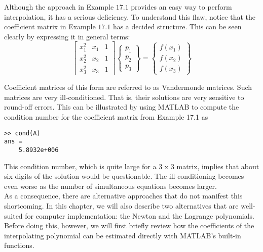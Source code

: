 \documentclass[../main.tex]{subfiles}
\begin{document}
        Although the approach in Example $17.1$ provides an easy way to perform interpolation, it has a serious deficiency. To understand this flaw, notice that the coefficient matrix in Example $17.1$ has a decided structure. This can be seen clearly by expressing it in general terms:
        $$
        \left[\begin{array}{lll}
        x_{1}^{2} & x_{1} & 1 \\
        x_{2}^{2} & x_{2} & 1 \\
        x_{3}^{2} & x_{3} & 1
        \end{array}\right]\left\{\begin{array}{l}
        p_{1} \\
        p_{2} \\
        p_{3}
        \end{array}\right\}=\left\{\begin{array}{l}
        f\left(x_{1}\right) \\
        f\left(x_{2}\right) \\
        f\left(x_{3}\right)
        \end{array}\right\}
        $$
    
        Coefficient matrices of this form are referred to as Vandermonde matrices. Such matrices are very ill-conditioned. That is, their solutions are very sensitive to round-off errors.
This can be illustrated by using MATLAB to compute the condition number for the coefficient matrix from Example 17.1 as

\begin{lstlisting}[numbers=none]
>> cond(A)
ans =
    5.8932e+006
\end{lstlisting}
This condition number, which is quite large for a 3 x 3 matrix, implies that about six digits
of the solution would be questionable. The ill-conditioning becomes even worse as the
number of simultaneous equations becomes larger.\\
As a consequence, there are alternative approaches that do not manifest this shortcoming. In this chapter, we will also describe two alternatives that are well-suited for
computer implementation: the Newton and the Lagrange polynomials. Before doing this,
however, we will first briefly review how the coefficients of the interpolating polynomial
can be estimated directly with MATLAB's built-in functions.
\end{document}
